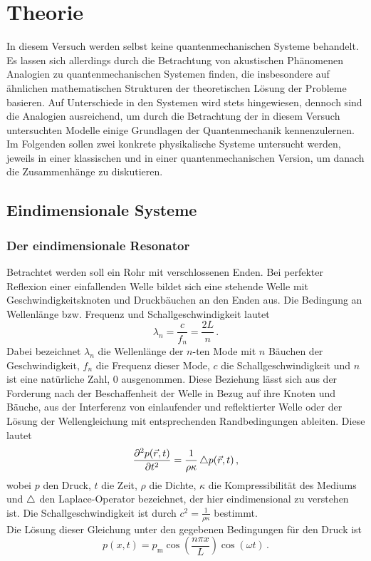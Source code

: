 \section{Theorie}
\label{sec:Theorie}
In diesem Versuch werden selbst keine quantenmechanischen Systeme behandelt. Es lassen sich allerdings durch die Betrachtung von akustischen Phänomenen Analogien zu quantenmechanischen Systemen finden, die insbesondere auf ähnlichen mathematischen Strukturen der theoretischen Lösung der Probleme basieren. Auf Unterschiede in den Systemen wird stets hingewiesen, dennoch sind die Analogien ausreichend, um durch die Betrachtung der in diesem Versuch untersuchten Modelle einige Grundlagen der Quantenmechanik kennenzulernen. Im Folgenden sollen zwei konkrete physikalische Systeme untersucht werden, jeweils in einer klassischen und in einer quantenmechanischen Version, um danach die Zusammenhänge zu diskutieren.

\subsection{Eindimensionale Systeme}
\label{subsec:eindimsyst}
\subsubsection{Der eindimensionale Resonator}
Betrachtet werden soll ein Rohr mit verschlossenen Enden. Bei perfekter Reflexion einer einfallenden Welle bildet sich eine stehende Welle mit Geschwindigkeitsknoten und Druckbäuchen an den Enden aus. Die Bedingung an Wellenlänge bzw. Frequenz und Schallgeschwindigkeit lautet
\begin{equation}
  \lambda_n = \frac{c}{f_n} = \frac{2L}{n}\,.
  \label{eqn:stehendeWelle}
\end{equation}
Dabei bezeichnet $\lambda_n$ die Wellenlänge der $n$-ten Mode mit $n$ Bäuchen der Geschwindigkeit, $f_n$ die Frequenz dieser Mode, $c$ die Schallgeschwindigkeit und $n$ ist eine natürliche Zahl, 0 ausgenommen.
Diese Beziehung lässt sich aus der Forderung nach der Beschaffenheit der Welle in Bezug auf ihre Knoten und Bäuche, aus der Interferenz von einlaufender und reflektierter Welle oder der Lösung der Wellengleichung mit entsprechenden Randbedingungen ableiten. Diese lautet
\begin{equation}
  \frac{\partial^2 p(\vec{r},t)}{\partial t^2} = \frac{1}{\rho \kappa} \mathop{}\!\mathbin\bigtriangleup p(\vec{r},t)\,,
  \label{eqn:wellengleichung}
\end{equation}
wobei $p$ den Druck, $t$ die Zeit, $\rho$ die Dichte, $\kappa$ die Kompressibilität des Mediums und $\mathop{}\!\mathbin\bigtriangleup$ den Laplace-Operator bezeichnet, der hier eindimensional zu verstehen ist. Die Schallgeschwindigkeit ist durch $c^2 = \frac{1}{\rho \kappa}$ bestimmt.\\
Die Lösung dieser Gleichung unter den gegebenen Bedingungen für den Druck ist
\begin{equation}
  p(x,t) = p_\text{m} \cos\left(\frac{n \pi x}{L}\right) \cos(\omega t)\,.
  \label{eqn:stehendeWelle}
\end{equation}


